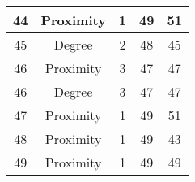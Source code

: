 \documentclass[results.tex]{subfiles}
\begin{document}
\begin{center}
\begin{tabular}{| c || c | c | c | c |}
    \hline
    44 & Proximity & 1 & 49 & 51 \\ 
    \hline
    45 & Degree & 2 & 48 & 45 \\ 
    \hline
    46 & Proximity & 3 & 47 & 47 \\ 
    \hline
    46 & Degree & 3 & 47 & 47 \\ 
    \hline
    47 & Proximity & 1 & 49 & 51 \\ 
    \hline
    48 & Proximity & 1 & 49 & 43 \\ 
    \hline
    49 & Proximity & 1 & 49 & 49 \\ 
    \hline   \end{tabular}
\end{center}
\end{document}
